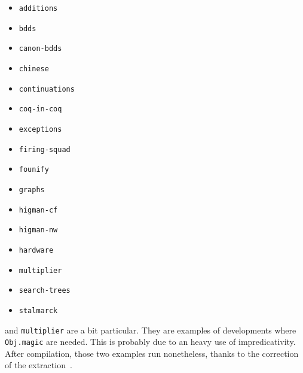 \begin{itemize}
\item {\tt additions}
\item {\tt bdds}
\item {\tt canon-bdds}
\item {\tt chinese}
\item {\tt continuations}
\item {\tt coq-in-coq}
\item {\tt exceptions}
\item {\tt firing-squad}
\item {\tt founify}
\item {\tt graphs}
\item {\tt higman-cf}
\item {\tt higman-nw}
\item {\tt hardware}
\item {\tt multiplier}
\item {\tt search-trees}
\item {\tt stalmarck}
\end{itemize}

 and {\tt multiplier} are a bit particular. They are
examples of developments where {\tt Obj.magic} are needed.  This is
probably due to an heavy use of impredicativity. After compilation, those
two examples run nonetheless, thanks to the correction of the
extraction~\cite{Let02}.

